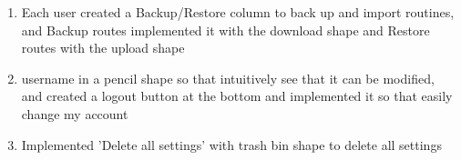 \documentclass[11pt, conference]{IEEEtran}
\begin{document}
\begin{enumerate}[label=\arabic*]
\begin{enumerate}[label=\alph*]
\begin{enumerate}
            \item Each user created a Backup/Restore column to back up and import routines, and Backup routes implemented it with the download shape and Restore routes with the upload shape\\

            \item username in a pencil shape so that intuitively see that it can be modified, and created a logout button at the bottom and implemented it so that easily change my account\\

            \item Implemented 'Delete all settings' with trash bin shape to delete all settings
    \end{enumerate}
\end{enumerate}
\end{enumerate}
\end{document}
